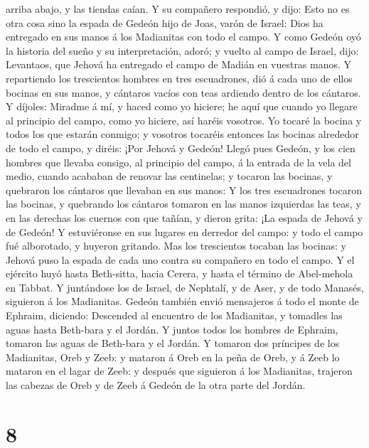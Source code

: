 arriba abajo, y las tiendas caían.  Y su compañero
respondió, y dijo: Esto no es otra cosa sino la espada de Gedeón hijo de
Joas, varón de Israel: Dios ha entregado en sus manos á los Madianitas
con todo el campo.  Y como Gedeón oyó la historia del sueño
y su interpretación, adoró; y vuelto al campo de Israel, dijo:
Levantaos, que Jehová ha entregado el campo de Madián en vuestras manos.
 Y repartiendo los trescientos hombres en tres escuadrones,
dió á cada uno de ellos bocinas en sus manos, y cántaros vacíos con teas
ardiendo dentro de los cántaros.  Y díjoles: Miradme á mí,
y haced como yo hiciere; he aquí que cuando yo llegare al principio del
campo, como yo hiciere, así haréis vosotros.  Yo tocaré la
bocina y todos los que estarán conmigo; y vosotros tocaréis entonces las
bocinas alrededor de todo el campo, y diréis: ¡Por Jehová y Gedeón!
 Llegó pues Gedeón, y los cien hombres que llevaba consigo,
al principio del campo, á la entrada de la vela del medio, cuando
acababan de renovar las centinelas; y tocaron las bocinas, y quebraron
los cántaros que llevaban en sus manos:  Y los tres
escuadrones tocaron las bocinas, y quebrando los cántaros tomaron en las
manos izquierdas las teas, y en las derechas los cuernos con que tañían,
y dieron grita: ¡La espada de Jehová y de Gedeón!  Y
estuviéronse en sus lugares en derredor del campo: y todo el campo fué
alborotado, y huyeron gritando.  Mas los trescientos
tocaban las bocinas: y Jehová puso la espada de cada uno contra su
compañero en todo el campo. Y el ejército huyó hasta Beth-sitta, hacia
Cerera, y hasta el término de Abel-mehola en Tabbat.  Y
juntándose los de Israel, de Nephtalí, y de Aser, y de todo Manasés,
siguieron á los Madianitas.  Gedeón también envió
mensajeros á todo el monte de Ephraim, diciendo: Descended al encuentro
de los Madianitas, y tomadles las aguas hasta Beth-bara y el Jordán. Y
juntos todos los hombres de Ephraim, tomaron las aguas de Beth-bara y el
Jordán.  Y tomaron dos príncipes de los Madianitas, Oreb y
Zeeb: y mataron á Oreb en la peña de Oreb, y á Zeeb lo mataron en el
lagar de Zeeb: y después que siguieron á los Madianitas, trajeron las
cabezas de Oreb y de Zeeb á Gedeón de la otra parte del Jordán.

\hypertarget{section-7}{%
\section{8}\label{section-7}}

